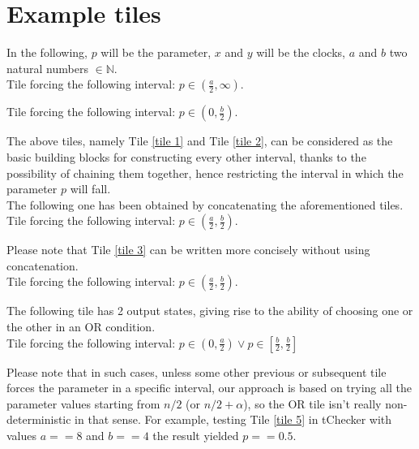 \documentclass[12pt, a4paper]{article}
\begin{document}

\section{Example tiles}

\noindent
In the following, $p$ will be the parameter, $x$ and $y$ will be the clocks, $a$ and $b$ two natural numbers $\in \mathbb{N}$.\\

Tile forcing the following interval: $p \in (\frac{a}{2}, \infty)$.



\bigskip

Tile forcing the following interval: $p \in (0, \frac{b}{2})$.



\noindent
The above tiles, namely Tile \ref{tile 1} and Tile \ref{tile 2}, can be considered as the basic building blocks for constructing every other interval, thanks to the possibility of chaining them together, hence restricting the interval in which the parameter $p$ will fall.\\

\noindent
The following one has been obtained by concatenating the aforementioned tiles.\\

Tile forcing the following interval: $p \in (\frac{a}{2}, \frac{b}{2})$.



\noindent
Please note that Tile \ref{tile 3} can be written more concisely without using concatenation.\\

Tile forcing the following interval: $p \in (\frac{a}{2}, \frac{b}{2})$.



\newpage

\noindent
The following tile has 2 output states, giving rise to the ability of choosing one or the other in an OR condition.\\

Tile forcing the following interval: $p \in (0, \frac{a}{2}) \vee p \in [\frac{b}{2}, \frac{b}{2}]$



\noindent
Please note that in such cases, unless some other previous or subsequent tile forces the parameter in a specific interval, our approach is based on trying all the parameter values starting from $n /2$ (or $n / 2 + \alpha$), so the OR tile isn't really non-deterministic in that sense. For example, testing Tile \ref{tile 5} in tChecker with values $a == 8$ and $b == 4$ the result yielded $p == 0.5$.\\
\end{document}
